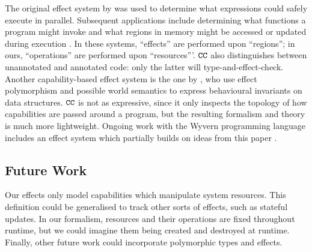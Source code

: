 The original effect system by \cite{lucassen88} was used to determine what expressions could safely execute in parallel. Subsequent applications include determining what functions a program might invoke \cite{tang94} and what regions in memory might be accessed or updated during execution \cite{talpin94}. In these systems, ``effects'' are performed upon ``regions''; in ours, ``operations'' are performed upon ``resources'''. $\mathtt{CC}$ also distinguishes between unannotated and annotated code: only the latter will type-and-effect-check. Another capability-based effect system is the one by \cite{devriese16}, who use effect polymorphism and possible world semantics to express behavioural invariants on data structures. $\mathtt{CC}$ is not as expressive, since it only inspects the topology of
how capabilities are passed around a program, but the resulting formalism and theory is much more
lightweight. Ongoing work with the Wyvern programming language includes an
effect system which partially builds on ideas from this paper \cite{melicher18}.

\vspace{-0.6cm}
\subsection{Future Work}
\vspace{-0.2cm}

Our effects only model capabilities which manipulate system resources. This
definition could be generalised to track other sorts of effects, such as stateful
updates. In our formalism, resources and their operations are fixed throughout
runtime, but we could imagine them being created and destroyed at runtime. 
Finally, other future work could incorporate polymorphic types and effects.
